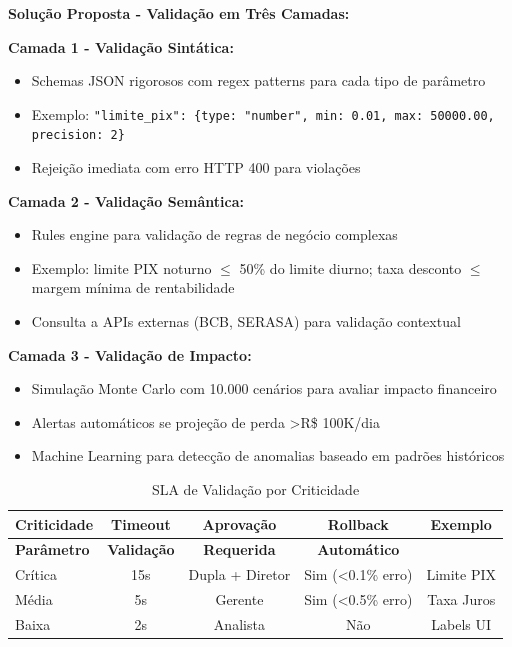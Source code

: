 \textbf{Solução Proposta - Validação em Três Camadas:}

\textbf{Camada 1 - Validação Sintática:}
\begin{itemize}
\item Schemas JSON rigorosos com regex patterns para cada tipo de parâmetro
\item Exemplo: \texttt{"limite\_pix": \{type: "number", min: 0.01, max: 50000.00, precision: 2\}}
\item Rejeição imediata com erro HTTP 400 para violações
\end{itemize}

\textbf{Camada 2 - Validação Semântica:}
\begin{itemize}
\item Rules engine para validação de regras de negócio complexas
\item Exemplo: limite PIX noturno $\leqslant$ 50\% do limite diurno; taxa desconto $\leqslant$ margem mínima de rentabilidade
\item Consulta a APIs externas (BCB, SERASA) para validação contextual
\end{itemize}

\textbf{Camada 3 - Validação de Impacto:}
\begin{itemize}
\item Simulação Monte Carlo com 10.000 cenários para avaliar impacto financeiro
\item Alertas automáticos se projeção de perda >R\$ 100K/dia
\item Machine Learning para detecção de anomalias baseado em padrões históricos
\end{itemize}

\begin{table}[h]
\centering
\caption{SLA de Validação por Criticidade}
\label{tab:sla-validacao}
\footnotesize
\begin{tabular}{|l|c|c|c|c|}
\rowcolor{azulPrincipal!10}
\hline
\textbf{Criticidade} & \textbf{Timeout} & \textbf{Aprovação} & \textbf{Rollback} & \textbf{Exemplo}\\
\hline
\textbf{Parâmetro} & \textbf{Validação} & \textbf{Requerida} & \textbf{Automático} & \textbf{}\\
\hline
\rowcolor{vermelho!10}
Crítica & 15s & Dupla + Diretor & Sim (<0.1\% erro) & Limite PIX\\
\hline
\rowcolor{amarelo!10}
Média & 5s & Gerente & Sim (<0.5\% erro) & Taxa Juros\\
\hline
\rowcolor{verde!10}
Baixa & 2s & Analista & Não & Labels UI\\
\hline
\end{tabular}
\end{table}

